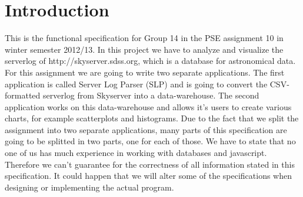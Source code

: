 \section{Introduction}
This is the functional specification for Group 14 in the PSE assignment 10 in winter semester 2012/13. 
In this project we have to analyze and visualize the serverlog of http://skyserver.sdss.org, which is a database for
astronomical data. For this assignment we are going to write two separate applications. The first application is called Server Log Parser (SLP)
and is going to convert the CSV-formatted serverlog from Skyserver into a data-warehouse. The second application works on this data-warehouse
and allows it's users to create various charts, for example scatterplots and histograms.
Due to the fact that we split the assignment into two separate applications, many parts of this specification are going to be 
splitted in two parts, one for each of those. 
\newline
\newline
We have to state that no one of us has much experience in working with databases and javascript. Therefore we can't guarantee 
for the correctness of all information stated in this specification. It could happen that we will alter some of the specifications
when designing or implementing the actual program.
